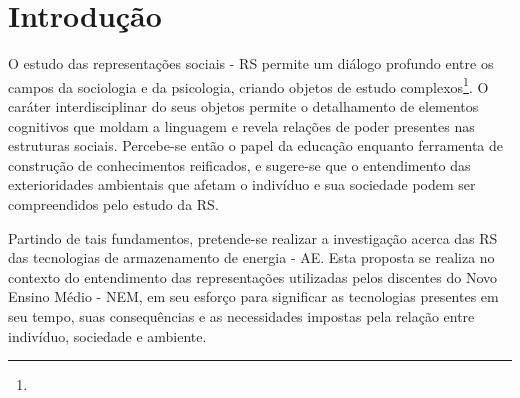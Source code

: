 \documentclass[
  12pt,       %
  openright,      %
  twoside,      %
  a4paper,      %
  english,      %
  french,       %
  spanish,      %
  brazil        %
  ]{abntex2}
\begin{document}

\tableofcontents*
\cleardoublepage



\textual

\chapter{Introdução}

O estudo das representações sociais - RS permite um diálogo profundo entre os campos da sociologia e da psicologia, criando objetos de estudo complexos\footnote{}. O caráter interdisciplinar do seus objetos permite o detalhamento de elementos cognitivos que moldam a linguagem e revela relações de poder presentes nas estruturas sociais. Percebe-se então o papel da educação enquanto ferramenta de construção de conhecimentos reificados, e sugere-se que o entendimento das exterioridades ambientais que afetam o indivíduo e sua sociedade podem ser compreendidos pelo estudo da RS.

Partindo de tais fundamentos, pretende-se realizar a investigação acerca das RS das tecnologias de armazenamento de energia - AE. Esta proposta se realiza no contexto do entendimento das representações utilizadas pelos discentes do Novo Ensino Médio - NEM, em seu esforço para significar as tecnologias presentes em seu tempo, suas consequências e as necessidades impostas pela relação entre indivíduo, sociedade e ambiente. 
\end{document}
